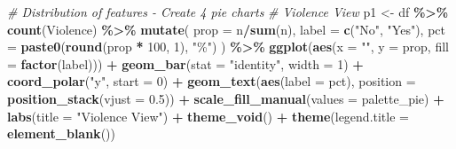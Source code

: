 \documentclass[
]{article}
\newenvironment{Shaded}{\begin{snugshade}}{\end{snugshade}}
\newcommand{\AttributeTok}[1]{\textcolor[rgb]{0.13,0.29,0.53}{#1}}
\newcommand{\CommentTok}[1]{\textcolor[rgb]{0.56,0.35,0.01}{\textit{#1}}}
\newcommand{\DecValTok}[1]{\textcolor[rgb]{0.00,0.00,0.81}{#1}}
\newcommand{\FloatTok}[1]{\textcolor[rgb]{0.00,0.00,0.81}{#1}}
\newcommand{\FunctionTok}[1]{\textcolor[rgb]{0.13,0.29,0.53}{\textbf{#1}}}
\newcommand{\NormalTok}[1]{#1}
\newcommand{\OtherTok}[1]{\textcolor[rgb]{0.56,0.35,0.01}{#1}}
\newcommand{\SpecialCharTok}[1]{\textcolor[rgb]{0.81,0.36,0.00}{\textbf{#1}}}
\newcommand{\StringTok}[1]{\textcolor[rgb]{0.31,0.60,0.02}{#1}}
\begin{document}
\begin{Shaded}
\begin{Highlighting}[]
\CommentTok{\# Distribution of features {-} Create 4 pie charts}
\CommentTok{\# Violence View}
\NormalTok{p1 }\OtherTok{\textless{}{-}}\NormalTok{ df }\SpecialCharTok{\%\textgreater{}\%}
  \FunctionTok{count}\NormalTok{(Violence) }\SpecialCharTok{\%\textgreater{}\%}
  \FunctionTok{mutate}\NormalTok{(}
    \AttributeTok{prop =}\NormalTok{ n}\SpecialCharTok{/}\FunctionTok{sum}\NormalTok{(n),}
    \AttributeTok{label =} \FunctionTok{c}\NormalTok{(}\StringTok{"No"}\NormalTok{, }\StringTok{"Yes"}\NormalTok{),}
    \AttributeTok{pct =} \FunctionTok{paste0}\NormalTok{(}\FunctionTok{round}\NormalTok{(prop }\SpecialCharTok{*} \DecValTok{100}\NormalTok{, }\DecValTok{1}\NormalTok{), }\StringTok{"\%"}\NormalTok{)}
\NormalTok{  ) }\SpecialCharTok{\%\textgreater{}\%}
  \FunctionTok{ggplot}\NormalTok{(}\FunctionTok{aes}\NormalTok{(}\AttributeTok{x =} \StringTok{""}\NormalTok{, }\AttributeTok{y =}\NormalTok{ prop, }\AttributeTok{fill =} \FunctionTok{factor}\NormalTok{(label))) }\SpecialCharTok{+}
  \FunctionTok{geom\_bar}\NormalTok{(}\AttributeTok{stat =} \StringTok{"identity"}\NormalTok{, }\AttributeTok{width =} \DecValTok{1}\NormalTok{) }\SpecialCharTok{+}
  \FunctionTok{coord\_polar}\NormalTok{(}\StringTok{"y"}\NormalTok{, }\AttributeTok{start =} \DecValTok{0}\NormalTok{) }\SpecialCharTok{+}
  \FunctionTok{geom\_text}\NormalTok{(}\FunctionTok{aes}\NormalTok{(}\AttributeTok{label =}\NormalTok{ pct), }\AttributeTok{position =} \FunctionTok{position\_stack}\NormalTok{(}\AttributeTok{vjust =} \FloatTok{0.5}\NormalTok{)) }\SpecialCharTok{+}
  \FunctionTok{scale\_fill\_manual}\NormalTok{(}\AttributeTok{values =}\NormalTok{ palette\_pie) }\SpecialCharTok{+}
  \FunctionTok{labs}\NormalTok{(}\AttributeTok{title =} \StringTok{"Violence View"}\NormalTok{) }\SpecialCharTok{+}
  \FunctionTok{theme\_void}\NormalTok{() }\SpecialCharTok{+}
  \FunctionTok{theme}\NormalTok{(}\AttributeTok{legend.title =} \FunctionTok{element\_blank}\NormalTok{())}


\end{Highlighting}
\end{Shaded}
\end{document}
